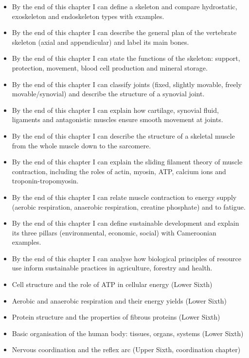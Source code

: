 \documentclass[11pt]{article}
\begin{document}
\begin{objectifs}
\begin{itemize}
\item By the end of this chapter I can define a skeleton and compare hydrostatic, exoskeleton and endoskeleton types with examples.
\item By the end of this chapter I can describe the general plan of the vertebrate skeleton (axial and appendicular) and label its main bones.
\item By the end of this chapter I can state the functions of the skeleton: support, protection, movement, blood cell production and mineral storage.
\item By the end of this chapter I can classify joints (fixed, slightly movable, freely movable/synovial) and describe the structure of a synovial joint.
\item By the end of this chapter I can explain how cartilage, synovial fluid, ligaments and antagonistic muscles ensure smooth movement at joints.
\item By the end of this chapter I can describe the structure of a skeletal muscle from the whole muscle down to the sarcomere.
\item By the end of this chapter I can explain the sliding filament theory of muscle contraction, including the roles of actin, myosin, ATP, calcium ions and troponin-tropomyosin.
\item By the end of this chapter I can relate muscle contraction to energy supply (aerobic respiration, anaerobic respiration, creatine phosphate) and to fatigue.
\item By the end of this chapter I can define sustainable development and explain its three pillars (environmental, economic, social) with Cameroonian examples.
\item By the end of this chapter I can analyse how biological principles of resource use inform sustainable practices in agriculture, forestry and health.
\end{itemize}
\end{objectifs}

\begin{prerequis}
\begin{itemize}
\item Cell structure and the role of ATP in cellular energy (Lower Sixth)
\item Aerobic and anaerobic respiration and their energy yields (Lower Sixth)
\item Protein structure and the properties of fibrous proteins (Lower Sixth)
\item Basic organisation of the human body: tissues, organs, systems (Lower Sixth)
\item Nervous coordination and the reflex arc (Upper Sixth, coordination chapter)
\end{itemize}
\end{prerequis}
\end{document}
